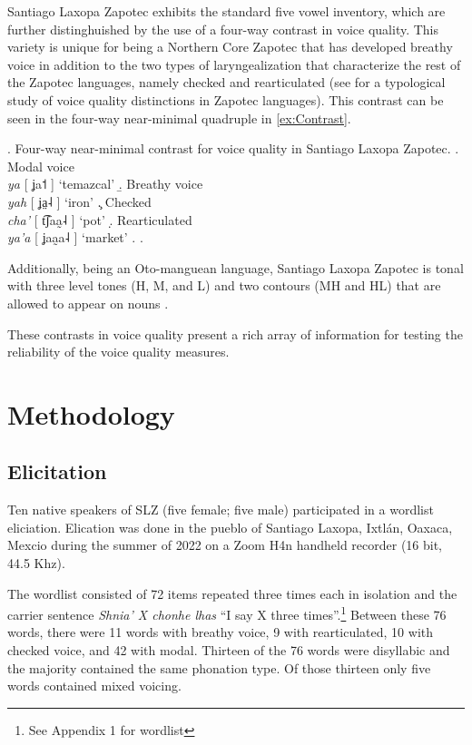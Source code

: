 \documentclass[12pt, letterpaper]{article}
\begin{document}
Santiago Laxopa Zapotec exhibits the standard five vowel inventory, which are further distinghuished by the use of a four-way contrast in voice quality. This variety is unique for being a Northern Core Zapotec that has developed breathy
voice in addition to the two types of laryngealization that characterize the rest of the
Zapotec languages, namely checked and rearticulated (see \cite{ariza-garciaPhonationTypesTones2018} for a typological study of voice quality distinctions in Zapotec languages). This contrast can be seen in the four-way near-minimal quadruple in \ref{ex:Contrast}.

\ex. Four-way near-minimal contrast for voice quality in Santiago Laxopa Zapotec. \label{ex:Contrast}
  \a. Modal voice\\
  \textit{ya} [ {\ipa ʝa˦} ] ‘temazcal’
  \b. Breathy voice\\ 
  \textit{yah} [ {\ipa ʝa̤˨} ] ‘iron’
  \c. Checked \\
  \textit{cha’} [ {\ipa t͡ʃaa̰˨} ] ‘pot’
  \d. Rearticulated\\ 
  \textit{ya’a} [ {\ipa ʝaa̰a˨} ] ‘market’
  \z. 
\z. 

Additionally, being an Oto-manguean language, Santiago Laxopa Zapotec is tonal with three level tones (H, M, and L) and two contours (MH and HL) that are allowed to appear on nouns \citep{brinkerhoffTonalPatternsTheir2022}.  

These contrasts in voice quality present a rich array of information for testing the reliability of the voice quality measures. 

\section{Methodology} \label{sec:Methods}

\subsection{Elicitation} \label{sec:Elicitation}
Ten native speakers of SLZ (five female; five male) participated in a wordlist eliciation. Elication was done in the pueblo of Santiago Laxopa, Ixtlán, Oaxaca, Mexcio during the summer of 2022 on a Zoom H4n handheld recorder (16 bit, 44.5 Khz). 

The wordlist consisted of 72 items repeated three times each in isolation and the carrier sentence \textit{Shnia' X chonhe lhas} ``I say X three times''.\footnote{See Appendix 1 for wordlist} Between these 76 words, there were 11 words with breathy voice, 9 with rearticulated, 10 with checked voice, and 42 with modal. Thirteen of the 76 words were disyllabic and the majority contained the same phonation type. Of those thirteen only five words contained mixed voicing.
\end{document}
